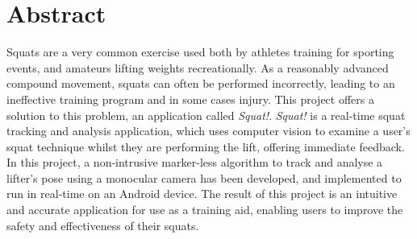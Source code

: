 \section{Abstract}

Squats are a very common exercise used both by athletes training for sporting events, and amateurs lifting weights recreationally. As a reasonably advanced compound movement, squats can often be performed incorrectly, leading to an ineffective training program and in some cases injury. This project offers a solution to this problem, an application called \emph{Squat!}. \emph{Squat!} is a real-time squat tracking and analysis application, which uses computer vision to examine a user's squat technique whilst they are performing the lift, offering immediate feedback. In this project, a non-intrusive marker-less algorithm to track and analyse a lifter's pose using a monocular camera has been developed, and implemented to run in real-time on an Android device. The result of this project is an intuitive and accurate application for use as a training aid, enabling users to improve the safety and effectiveness of their squats.